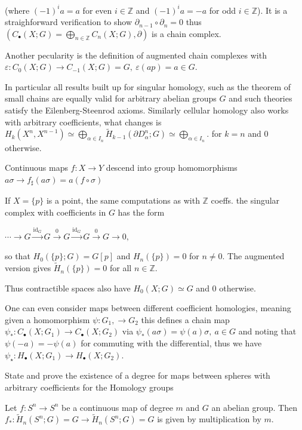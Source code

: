 (where \((-1)^i a = a\) for even \(i \in \mathbb{Z}\) and \((-1)^i a = -a\) for odd \(i \in \mathbb{Z}\)). 
It is a straighforward verification to show \(\partial_{n-1} \circ \partial_n = 0\) 
thus \((C_\bullet(X; G) = \bigoplus_{n \in \mathbb{Z}} C_n(X; G), \partial)\) is a chain complex.

Another pecularity is the definition of augmented chain complexes with
\(\varepsilon : C_0(X;G) \to C_{-1}(X;G) = G,\ \varepsilon(ap) = a \in G \).

In particular all results built up for singular homology, such as the theorem of small chains
are equally valid for arbitrary abelian groups \( G \) and such theories satisfy the Eilenberg-Steenrod axioms.
Similarly cellular homology also works with arbitrary coefficients, what changes is 
\( H_k(X^n, X^{n-1}) \simeq \bigoplus_{\alpha \in I_n} \tilde{H}_{k-1}(\partial D^n_\alpha;G) \simeq \bigoplus_{\alpha \in I_n} \).
for \( k = n \) and \( 0 \) otherwise.

Continuous maps \( f : X \to Y \) descend into group homomorphisms \( a\sigma \to f_\sharp(a\sigma) = a(f\circ\sigma) \)

If \( X = \{p\} \) is a point, the same computations as with \( \mathbb{Z} \) coeffs.
the singular complex with coefficients in \( G \) has the form

\(\cdots \xrightarrow{} G \xrightarrow{\text{id}_G} G \xrightarrow{0} G \xrightarrow{\text{id}_G} G \xrightarrow{0} G \xrightarrow{} 0, \)

so that \(H_0(\{p\}; G) = G[p]\) and \(H_n(\{p\}) = 0\) for \(n \neq 0\). 
The augmented version gives \(\tilde{H}_n(\{p\}) = 0\) for all \(n \in \mathbb{Z}\).

Thus contractible spaces also have \( H_0(X;G) \simeq G \) and \( 0 \) otherwise.

One can even consider maps between different coefficient homologies, meaning given a homomorphism \( \psi : G_1, \to G_2 \)
this defines a chain map \( \psi_\ast : C_\bullet(X;G_1) \to C_\bullet(X;G_2) \) via \( \psi_\ast(a\sigma) = \psi(a)\sigma,\ a \in G \)
and noting that \( \psi(-a) = -\psi(a) \) for commuting with the differential, thus we have \( \psi_\star : H_\bullet(X;G_1) \to H_\bullet(X;G_2) \).



State and prove the existence of a degree for maps between spheres with arbitrary coefficients for the Homology groups

Let \(f : S^n \to S^n\) be a continuous map of degree \(m\) and \(G\) an abelian group. 
Then \(f_* : \tilde{H}_n(S^n; G) = G \to \tilde{H}_n(S^n; G) = G\) is given by multiplication by \(m\).

